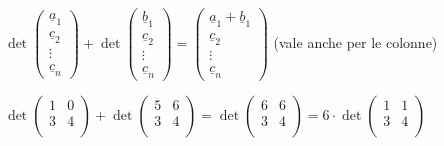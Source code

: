   \begin{proposizione}
    \phantom{}\\
    $\det
    \begin{pmatrix}
      \underline{a}_1\\
      \underline{c}_2\\
      \vdots\\
      \underline{c}_n
    \end{pmatrix}+\det
    \begin{pmatrix}
      \underline{b}_1\\
      \underline{c}_2\\
      \vdots\\
      \underline{c}_n
    \end{pmatrix}=
    \begin{pmatrix}
      \underline{a}_1+\underline{b}_1\\
      \underline{c}_2\\
      \vdots\\
      \underline{c}_n
    \end{pmatrix}$ (vale anche per le colonne)\\
    \begin{es}
      $\det
      \begin{pmatrix}
        1 & 0\\
        3 & 4\\
      \end{pmatrix}+\det
      \begin{pmatrix}
        5 & 6\\
        3 & 4\\
      \end{pmatrix}=\det
      \begin{pmatrix}
        6 & 6\\
        3 & 4\\
      \end{pmatrix}=6\cdot\det
      \begin{pmatrix}
        1 & 1\\
        3 & 4\\
      \end{pmatrix}$
    \end{es}
  \end{proposizione}

